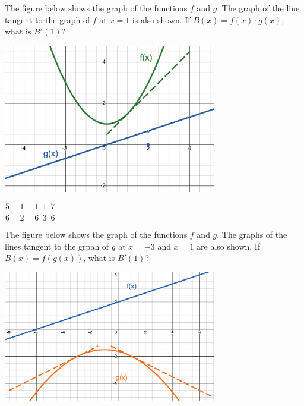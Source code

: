 \begin{questions}
    \question The figure below shows the graph of the functions $f$ and $g$. The graph of the line tangent to the graph of $f$ at $x = 1$ is also shown. If $B(x) = f(x) \cdot g(x)$, what is $B'(1)$? 
    \begin{center}
        \includegraphics[width = 0.7\textwidth]{Support/Chapter 1 Graphics/1.7-Graphic8.png}
    \end{center} \vspace{11pt}

    \begin{oneparchoices}
        \choice $\dfrac{5}{6}$
        \choice $-\dfrac{1}{2}$
        \choice $-\dfrac{1}{6}$
        \choice $\dfrac{1}{3}$
        \choice $\dfrac{7}{6}$
    \end{oneparchoices} \par \horizontalline

    \question The figure below shows the graph of the functions $f$ and $g$. The graphs of the lines tangent to the grpah of $g$ at $x = -3$ and $x = 1$ are also shown. If $B(x) = f(g(x))$, what is $B'(1)$?
    \begin{center}
        \includegraphics[width = 0.7\textwidth]{Support/Chapter 1 Graphics/1.7-Graphic9.png}
    \end{center} \vspace{11pt}


\end{questions}

